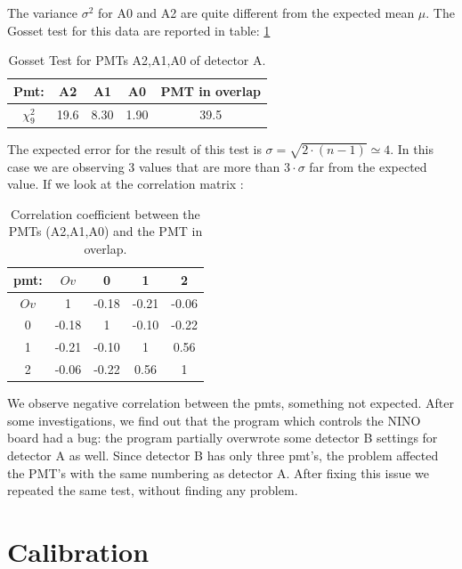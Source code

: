 The variance $\sigma^{2}$ for A0 and A2 are quite different from the expected mean $\mu$. The Gosset test for this data are reported in table: \ref{tab:GossetA0A1A2} 

\begingroup
\setlength{\tabcolsep}{8pt} %
\renewcommand{\arraystretch}{1.2} %
\begin{table}[!ht]
\centering
\begin{tabular}{c|cccc}
\hline 
Pmt: & A2 & A1 & A0 & PMT in overlap \\ 
\hline
$\chi^{2}_{9}$ & 19.6 & 8.30 & 1.90 & 39.5\\ 
\hline
\end{tabular} 
\caption{Gosset Test for PMTs A2,A1,A0 of detector A.}
\label{tab:GossetA0A1A2}
\end{table}
\endgroup
\smallskip

The expected error for the result of this test is $\sigma = \sqrt{2 \cdot (n-1)} \simeq 4$. In this case we are observing 3 values that are more than  $3 \cdot \sigma$ far from the expected value. If we look at the correlation matrix :

\begin{table}[!h]
\centering
\begin{tabular}{ccccc}
\hline 
pmt: & $Ov$ & 0 & 1 & 2 \\ 
\hline 
$Ov$ & 1 & -0.18  & -0.21  & -0.06  \\ 
0 	 & -0.18  & 1 & -0.10  & -0.22  \\ 
1    & -0.21  & -0.10  & 1 & 0.56  \\ 
2    & -0.06 & -0.22  & 0.56  & 1 \\ 
\hline 
\end{tabular}
\caption{Correlation coefficient between the PMTs (A2,A1,A0) and the PMT in overlap.}
\end{table}


We observe negative correlation between the pmts, something not expected. After some investigations, we find out that the program which controls the NINO board had a bug: the program partially overwrote some detector B settings for detector A as well. Since detector B has only three pmt's, the problem affected the PMT's with the same numbering as detector A. After fixing this issue we repeated the same test, without finding any problem. 

\section{Calibration}

